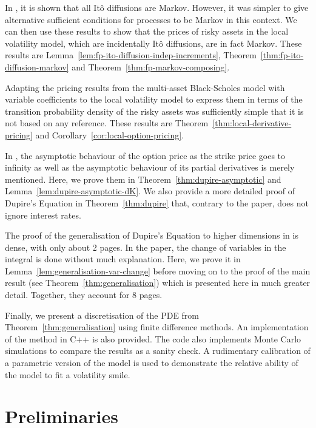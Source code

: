 \documentclass[english]{article}
\numberwithin{equation}{section}
\numberwithin{figure}{section}
\theoremstyle{bolddescit}
\theoremstyle{definition}
\theoremstyle{definition}
\theoremstyle{plain}
\theoremstyle{plain}
\theoremstyle{bolddesc}
\theoremstyle{plain}
\theoremstyle{remark}
\begin{document}
In \textcite{oksendal_stochastic_2003}, it is shown that all It\^o diffusions are Markov. However, it was simpler to give alternative sufficient conditions for processes to be Markov in this context. We can then use these results to show that the prices of risky assets in the local volatility model, which are incidentally It\^o diffusions, are in fact Markov. These results are Lemma~\ref{lem:fp-ito-diffusion-indep-increments}, Theorem~\ref{thm:fp-ito-diffusion-markov} and Theorem~\ref{thm:fp-markov-composing}.

Adapting the pricing results from the multi-asset Black-Scholes model with variable coefficients to the local volatility model to express them in terms of the transition probability density of the risky assets was sufficiently simple that it is not based on any reference. These results are Theorem~\ref{thm:local-derivative-pricing} and Corollary~\ref{cor:local-option-pricing}.

In \textcite{dupire_pricing_1993}, the asymptotic behaviour of the option price as the strike price goes to infinity as well as the asymptotic behaviour of its partial derivatives is merely mentioned. Here, we prove them in Theorem~\ref{thm:dupire-asymptotic} and Lemma~\ref{lem:dupire-asymptotic-dK}. We also provide a more detailed proof of Dupire's Equation in Theorem~\ref{thm:dupire} that, contrary to the paper, does not ignore interest rates.

The proof of the generalisation of Dupire's Equation to higher dimensions in \textcite{amster_towards_2009} is dense, with only about 2 pages. In the paper, the change of variables in the integral is done without much explanation. Here, we prove it in Lemma~\ref{lem:generalisation-var-change} before moving on to the proof of the main result (see Theorem~\ref{thm:generalisation}) which is presented here in much greater detail. Together, they account for 8 pages.

Finally, we present a discretisation of the PDE from Theorem~\ref{thm:generalisation} using finite difference methods. An implementation of the method in C++ is also provided. The code also implements Monte Carlo simulations to compare the results as a sanity check. A rudimentary calibration of a parametric version of the model is used to demonstrate the relative ability of the model to fit a volatility smile.

\section{Preliminaries}\label{sec:preliminaries}
\end{document}
